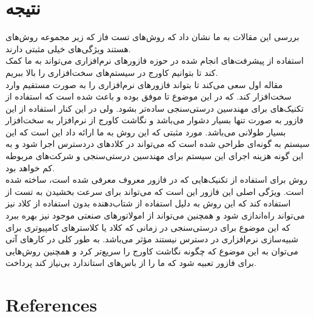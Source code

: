 \documentclass[conference]{IEEEtran}
\begin{document}
\section{نتیجه}
بررسی این مقالات به ما نشان داد که روش‌های تست فاز که زیر مجموعه
روش‌های
هستند ویژگی‌های خیلی مثبتی دارند. \\
استفاده از پیشرفت‌های انجام شده در حوزه فازور‌های نرم‌افزاری می‌تواند به ما کمک کند
تا بتوانیم کاورج در سیستم‌های سخت‌افزاری را بالا ببریم. \\
مقاله اول سعی می‌کند تا بتواند فازور‌های نرم‌افزاری را به صورت مستقیم وارد سخت‌افزار کند. که
در این موضوع تا موفق بوده و باعث شده است که استفاده از تکنیک‌های
برای مهندسین درستی‌سنجی ساده‌تر بشود.
ولی در این کنار استفاده از این فازور به صورت تنها بسیار دشوار می‌باشد
و نگاشت کاورج از نرم‌افزار به سخت‌افزار بسیار طولانی می‌باشد.
مورد مثبتی که این روش به ما ارائه داد این است که این سیستم به گونه‌ای طراحی شده است که می‌تواند
در کلاد‌های دردسترس اجرا شود و به این گونه هزینه اجرای این سیستم برای مهندسین درستی‌سنجی
و شرکت‌های مربوطه کم خواهد بود. \\
روش‌
برای استفاده از تکنیک‌هایی که در فازور معروف
معرفی شده است، ساخته شده است.
ویژگی اصلی این فازور این است که می‌تواند برای سرعت بخشیدن به تست از
استفاده کند که این روش به دلیل استفاده از شتاب‌دهنده
بدون استفاده از کلاد نیز می‌تواند راه‌اندازی شود و همچنین می‌تواند از امولاتور‌‌های
صنعتی موجود نیز بهره ببرد که این موضوع برای درستی‌سنجی در زمانی
که کلاد یا کلاستر‌های کامپیوتری برای شبیه‌سازی نرم‌افزاری در دسترس نیستند
مؤثر می‌باشد.
به طور کلی در کار‌های آتی می‌توان به این موضوع که چگونه نگاشت
کاورج را سریع‌تر کرد و همچنین روش‌هایی برای فازور تعبیه شود
که ما را از باس‌های استاندارد بی‌نیاز کند پرداخت.
\section*{References}
\end{document}
